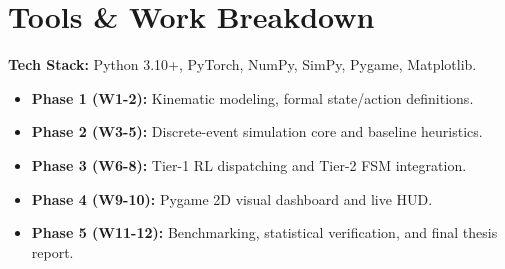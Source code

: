 \documentclass[10pt,a4paper,twocolumn]{article}
\begin{document}
\section{Tools \& Work Breakdown}
\textbf{Tech Stack:} Python 3.10+, PyTorch, NumPy, SimPy, Pygame, Matplotlib.
\begin{itemize}
    \item \textbf{Phase 1 (W1-2):} Kinematic modeling, formal state/action definitions.
    \item \textbf{Phase 2 (W3-5):} Discrete-event simulation core and baseline heuristics.
    \item \textbf{Phase 3 (W6-8):} Tier-1 RL dispatching and Tier-2 FSM integration.
    \item \textbf{Phase 4 (W9-10):} Pygame 2D visual dashboard and live HUD.
    \item \textbf{Phase 5 (W11-12):} Benchmarking, statistical verification, and final thesis report.
\end{itemize}
\end{document}
